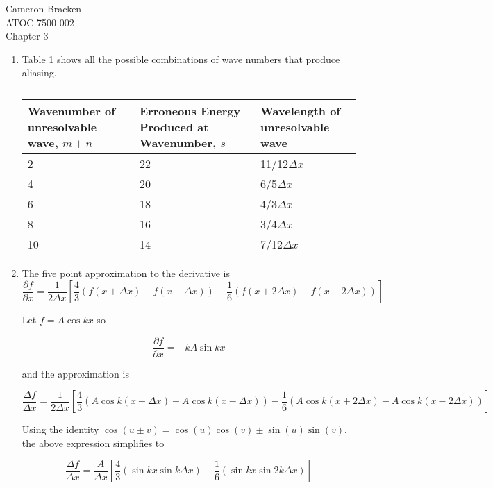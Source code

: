 \documentclass[11pt]{article}
\begin{document}
\begin{flushright}
Cameron Bracken\\
ATOC 7500-002\\
Chapter 3
\end{flushright}

\begin{enumerate}
\item Table 1 shows all the possible combinations of wave numbers that produce aliasing. 

\begin{table}[htdp]
\begin{center}
\begin{tabular}{p{1in}p{1in}p{1in}}
\toprule
\raggedright Wavenumber of unresolvable wave, $m+n$ & \raggedright Erroneous Energy Produced at Wavenumber, $s$ &   Wavelength of unresolvable wave \\
\midrule
2 & 22 & 11/12$\Delta x$ \\
4 & 20 & 6/5$\Delta x$ \\
6 & 18 & 4/3$\Delta x$ \\
8 & 16 & 3/4$\Delta x$ \\
10 & 14 & 7/12$\Delta x$\\
\bottomrule
\end{tabular} 
\caption{}
\end{center}
\label{defaulttable}
\end{table}

\item 
The five point approximation to the derivative is
$$
\frac{\partial f}{\partial x} = \frac{1}{2\Delta x}\left[ \frac{4}{3}\left(f(x+\Delta x)-f(x-\Delta x)\right)-\frac{1}{6}\left(f(x+2\Delta x)-f(x-2\Delta x)\right)\right]
$$

Let $f=A\cos kx$ so 

$$
\frac{\partial f}{\partial x} = -kA\sin{kx}
$$

and the approximation is

$$
\frac{\Delta f}{\Delta x} = \frac{1}{2\Delta x}\left[ \frac{4}{3}\left(A\cos k(x+\Delta x)-A\cos k(x-\Delta x)\right)-\frac{1}{6}\left(A\cos k(x+2\Delta x)-A\cos k(x-2\Delta x)\right)\right]
$$

Using the identity $\cos(u\pm v)=\cos(u)\cos(v)\pm\sin(u)\sin(v)$, the above expression simplifies to 

$$
\frac{\Delta f}{\Delta x} = \frac{A}{\Delta x}\left[ \frac{4}{3}\left(\sin{kx}\sin{k\Delta x}\right)-\frac{1}{6}\left(\sin{kx}\sin{2k\Delta x} \right)\right]
$$


\end{enumerate}
\end{document}

